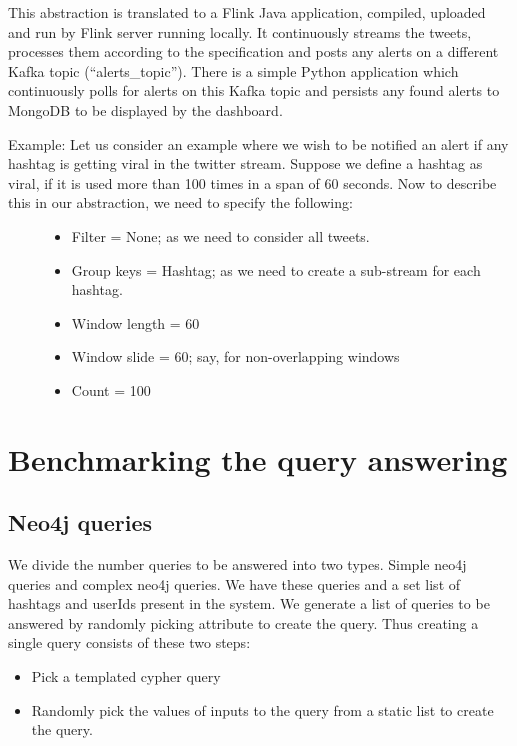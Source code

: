 \documentclass[letterpaper,10pt,english]{sphinxmanual}
\begin{document}
This abstraction is translated to a Flink Java application, compiled, uploaded and run by Flink server running locally. It continuously streams the tweets, processes them according to the specification and posts any alerts on a different Kafka topic (“alerts\_topic”). There is a simple Python application which continuously polls for alerts on this Kafka topic and persists any found alerts to MongoDB to be displayed by the dashboard.
\begin{description}
\item[{Example: Let us consider an example where we wish to be notified an alert if any hashtag is getting viral in the twitter stream. Suppose we define a hashtag as viral, if it is used more than 100 times in a span of 60 seconds. Now to describe this in our abstraction, we need to specify the following:}] \leavevmode\begin{itemize}
\item {} 
Filter = None; as we need to consider all tweets.

\item {} 
Group keys = Hashtag; as we need to create a sub-stream for each hashtag.

\item {} 
Window length = 60

\item {} 
Window slide = 60; say, for non-overlapping windows

\item {} 
Count = 100

\end{itemize}

\end{description}


\chapter{Benchmarking the query answering}
\label{\detokenize{benchmarking:benchmarking-the-query-answering}}\label{\detokenize{benchmarking::doc}}

\section{Neo4j queries}
\label{\detokenize{benchmarking:neo4j-queries}}
We divide the number queries to be answered into two types. Simple  neo4j queries and complex neo4j queries. We have these queries and a set list of hashtags and userIds present in the system. We generate a list of queries to be answered by randomly picking attribute to create the query. Thus creating a single query consists of these two steps:
\begin{itemize}
\item {} 
Pick a templated cypher query

\item {} 
Randomly pick the values of inputs to the query from a static list to create the query.

\end{itemize}
\end{document}
